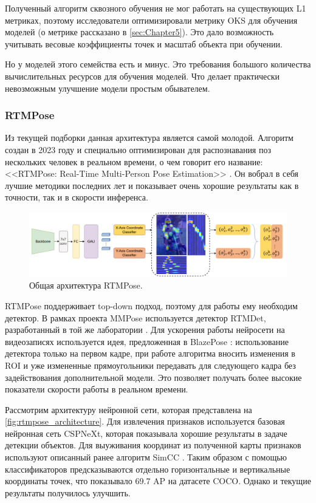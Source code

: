 Полученный алгоритм сквозного обучения не мог работать на существующих L1 метриках, поэтому исследователи оптимизировали метрику OKS для обучения моделей (о метрике рассказано в \autoref{sec:Chapter5}). Это дало возможность учитывать весовые коэффициенты точек и масштаб объекта при обучении.

Но у моделей этого семейства есть и минус. Это требования большого количества вычислительных ресурсов для обучения моделей. Что делает практически невозможным улучшение модели простым обывателем.
 

\subsubsection*{RTMPose}

Из текущей подборки данная архитектура является самой молодой. Алгоритм создан в 2023 году и специально оптимизирован для распознавания поз нескольких человек в реальном времени, о чем говорит его название: <<RTMPose: Real-Time Multi-Person Pose Estimation>> \cite{rtmpose}. Он вобрал в себя лучшие методики последних лет и показывает очень хорошие результаты как в точности, так и в скорости инференса.

\begin{figure}[h]
	\centering
	\includegraphics[width=\textwidth]{./images/rtmpose}
	\caption{Общая архитектура RTMPose. \cite{rtmpose}}
	\label{fig:rtmpose_architecture}
\end{figure}

RTMPose поддерживает top-down подход, поэтому для работы ему необходим детектор. В рамках проекта MMPose используется детектор RTMDet, разработанный в той же лаборатории \cite{mmpose, rtmdet}. Для ускорения работы нейросети на видеозаписях используется идея, предложенная в BlazePose \cite{BlazePose}: использование детектора только на первом кадре, при работе алгоритма вносить изменения в ROI и уже измененные прямоугольники передавать для следующего кадра без задействования дополнительной модели. Это позволяет получать более высокие показатели скорости работы в реальном времени.

Рассмотрим архитектуру нейронной сети, которая представлена на \autoref{fig:rtmpose_architecture}. Для извлечения признаков используется базовая нейронная сеть CSPNeXt, которая показывала хорошие результаты в задаче детекции объектов. Для выуживания координат из полученной карты признаков используют описанный ранее алгоритм SimCC \cite{simcc}. Таким образом с помощью классификаторов предсказываются отдельно горизонтальные и вертикальные координаты точек, что показывало 69.7 AP на датасете COCO. Однако и текущие результаты получилось улучшить.

